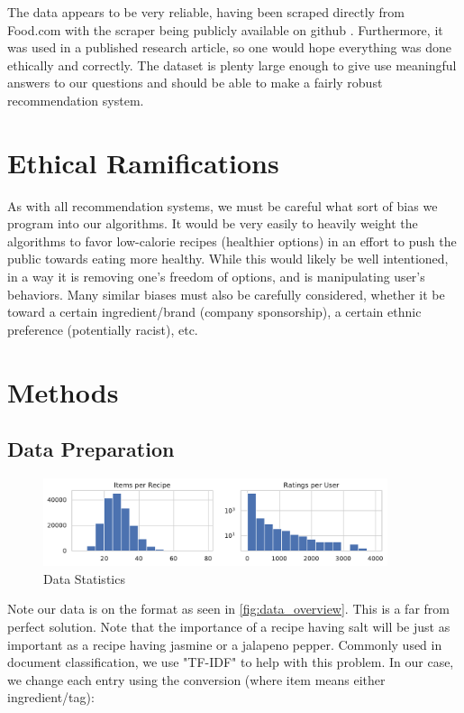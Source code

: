 \documentclass[11pt]{article}
\begin{document}
The data appears to be very reliable, having been scraped directly from Food.com with the scraper being publicly available on github \cite{data_scraper}. Furthermore, it was used in a published research article, so one would hope everything was done ethically and correctly. The dataset is plenty large enough to give use meaningful answers to our questions and should be able to make a fairly robust recommendation system.


\section{Ethical Ramifications}
As with all recommendation systems, we must be careful what sort of bias we program into our algorithms. It would be very easily to heavily weight the algorithms to favor low-calorie recipes (healthier options) in an effort to push the public towards eating more healthy. While this would likely be well intentioned, in a way it is removing one's freedom of options, and is manipulating user's behaviors. Many similar biases must also be carefully considered, whether it be toward a certain ingredient/brand (company sponsorship), a certain ethnic preference (potentially racist), etc.

\section{Methods}

\subsection{Data Preparation}
\begin{figure}[t]
\centering
\includegraphics[width=0.9\textwidth]{figs/dist.pdf}
\caption{Data Statistics}
\label{fig:dist}
\end{figure}

Note our data is on the format as seen in \ref{fig:data_overview}. This is a far from perfect solution. Note that the importance of a recipe having salt will be just as important as a recipe having jasmine or a jalapeno pepper. Commonly used in document classification, we use "TF-IDF" to help with this problem. In our case, we change each entry using the conversion (where item means either ingredient/tag):
\end{document}
